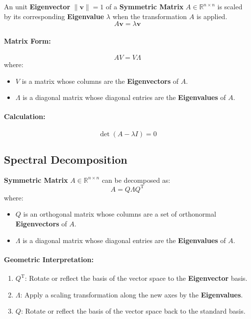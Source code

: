 \documentclass{article}
\begin{document}
An unit \textbf{Eigenvector} $\|\mathbf{v}\| = 1$ of a \textbf{Symmetric Matrix} $A \in \mathbb{R}^{n \times n}$ is scaled by its corresponding \textbf{Eigenvalue} $\lambda$ when the transformation $A$ is applied.
\[
    A\mathbf{v} = \lambda \mathbf{v}
\]
\paragraph{Matrix Form:}
\[
    AV = V\Lambda
\]
where:
\begin{itemize}
    \item $V$ is a matrix whose columns are the \textbf{Eigenvectors} of $A$.
    \item $\Lambda$ is a diagonal matrix whose diagonal entries are the \textbf{Eigenvalues} of $A$.
\end{itemize}
\paragraph{Calculation:}
\[
    \det(A - \lambda I) = 0
\]

\subsection{Spectral Decomposition}

\textbf{Symmetric Matrix} $A \in \mathbb{R}^{n \times n}$ can be decomposed as:
\[
    A = Q \Lambda Q^{\mathrm{T}}
\]
where:
\begin{itemize}
    \item $Q$ is an orthogonal matrix whose columns are a set of orthonormal \textbf{Eigenvectors} of $A$.
    \item $\Lambda$ is a diagonal matrix whose diagonal entries are the \textbf{Eigenvalues} of $A$.
\end{itemize}
\paragraph{Geometric Interpretation:}
\begin{enumerate}
    \item $Q^{\mathrm{T}}$: Rotate or reflect the basis of the vector space to the \textbf{Eigenvector} basis.
    \item $\Lambda$: Apply a scaling transformation along the new axes by the \textbf{Eigenvalues}.
    \item $Q$: Rotate or reflect the basis of the vector space back to the standard basis.
\end{enumerate}
\end{document}
